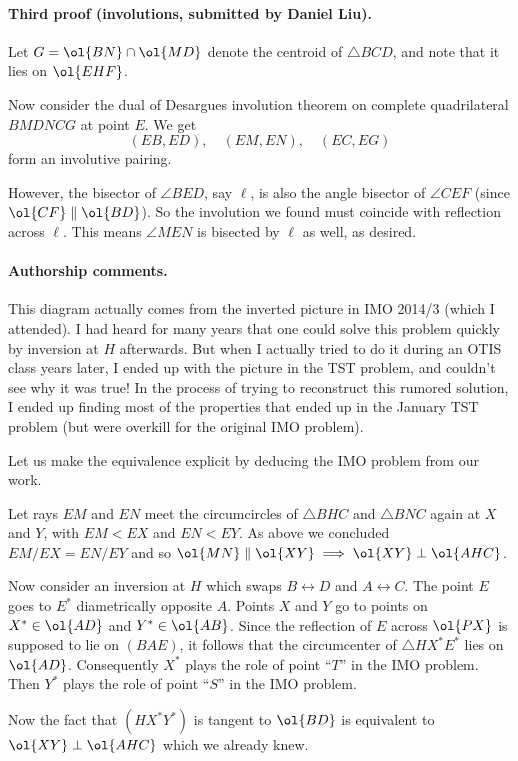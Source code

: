 \paragraph{Third proof (involutions, submitted by Daniel Liu).}
Let $G = \ol{BN} \cap \ol{MD}$ denote the centroid of $\triangle BCD$,
and note that it lies on $\ol{EHF}$.

Now consider the dual of Desargues involution theorem on complete
quadrilateral $BMDNCG$ at point $E$.
We get
\[ (EB,ED), \quad (EM,EN), \quad (EC,EG) \]
form an involutive pairing.

However, the bisector of $\angle BED$, say $\ell$,
is also the angle bisector of $\angle CEF$ (since $\ol{CF} \parallel \ol{BD}$).
So the involution we found must coincide with reflection across $\ell$.
This means $\angle MEN$ is bisected by $\ell$ as well, as desired.

\paragraph{Authorship comments.}
This diagram actually comes from the inverted
picture in IMO 2014/3 (which I attended).
I had heard for many years that one could
solve this problem quickly by inversion at $H$ afterwards.
But when I actually tried to do it during an OTIS class
years later, I ended up with the picture in the TST problem,
and couldn't see why it was true!
In the process of trying to reconstruct this rumored solution,
I ended up finding most of the properties
that ended up in the January TST problem
(but were overkill for the original IMO problem).

Let us make the equivalence explicit
by deducing the IMO problem from our work.

Let rays $EM$ and $EN$ meet the circumcircles of $\triangle BHC$
and $\triangle BNC$ again at $X$ and $Y$, with $EM < EX$ and $EN < EY$.
As above we concluded $EM/EX = EN/EY$
and so $\ol{MN} \parallel \ol{XY} \implies \ol{XY} \perp \ol{AHC}$.

Now consider an inversion at $H$ which swaps
$B \leftrightarrow D$ and $A \leftrightarrow C$.
The point $E$ goes to $E^\ast$ diametrically opposite $A$.
Points $X$ and $Y$ go to points on $X^\ast \in \ol{AD}$ and $Y^\ast \in \ol{AB}$.
Since the reflection of $E$ across $\ol{PX}$ is supposed to lie on $(BAE)$,
it follows that the circumcenter of $\triangle HX^\ast E^\ast$
lies on $\ol{AD}$.
Consequently $X^\ast$ plays the role of point ``$T$'' in the IMO problem.
Then $Y^\ast$ plays the role of point ``$S$'' in the IMO problem.

Now the fact that $(HX^\ast Y^\ast)$ is tangent to $\ol{BD}$
is equivalent to $\ol{XY} \perp \ol{AHC}$ which we already knew.
